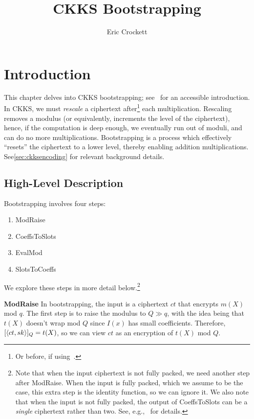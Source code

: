 \documentclass[../fheimpl.tex]{subfiles}
\title{CKKS Bootstrapping}
\author{Eric Crockett}
\begin{document}
    \ifcompileasbook
    \else
        \maketitle
        \listoffixmes
    \fi

    \section{Introduction}
    This chapter delves into CKKS bootstrapping; see~\cite{cryptoeprint:2023/149} for an accessible introduction. In CKKS, we must \emph{rescale} a ciphertext after\footnote{Or before, if using~\cite{cryptoeprint:2020/1118}.} each multiplication. Rescaling removes a modulus (or equivalently, increments the level of the ciphertext), hence, if the computation is deep enough, we eventually run out of moduli, and can do no more multiplications. Bootstrapping is a process which effectively ``resets'' the ciphertext to a lower level, thereby enabling addition multiplications. See\cref{sec:ckksencoding} for relevant background details.
    
    \subsection{High-Level Description}
    Bootstrapping involves four steps:
    \begin{enumerate}
        \item ModRaise
        \item CoeffsToSlots
        \item EvalMod
        \item SlotsToCoeffs
    \end{enumerate}
    We explore these steps in more detail below.\footnote{Note that when the input ciphertext is not fully packed, we need another step after ModRaise. When the input is fully packed, which we assume to be the case, this extra step is the identity function, so we can ignore it. We also note that when the input is not fully packed, the output of CoeffsToSlots can be a \emph{single} ciphertext rather than two. See, e.g.,~\cite{cryptoeprint:2018/1043} for details.}
    
    \textbf{ModRaise} In bootstrapping, the input is a ciphertext $ct$ that encrypts $m(X)$ mod $q$. The first step is to raise the modulus to $Q \gg q$, with the idea being that $t(X)$ doesn't wrap mod $Q$ since $I(x)$ has small coefficients. Therefore, $[\langle ct, sk\rangle]_Q = t(X)$, so we can view $ct$ as an encryption of $t(X)$ mod $Q$. 
    
\end{document}
